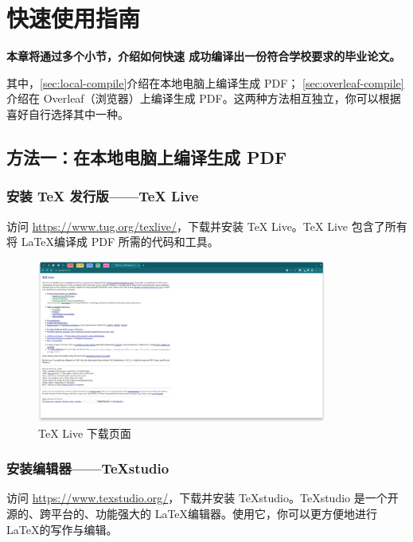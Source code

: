 \chapter{快速使用指南}
\label{ch:quick-start}

\textbf{本章将通过多个小节，介绍如何快速
成功编译出一份符合学校要求的毕业论文。}

其中，\autoref{sec:local-compile}介绍在本地电脑上编译生成 PDF；
\autoref{sec:overleaf-compile}介绍在 Overleaf（浏览器）上编译生成 PDF。这两种方法相互独立，你可以根据喜好自行选择其中一种。

\section{方法一：在本地电脑上编译生成 PDF}
\label{sec:local-compile}

\subsection{安装 TeX 发行版——TeX Live}

访问 \url{https://www.tug.org/texlive/}，下载并安装 TeX Live。TeX Live 包含了所有将 \LaTeX 编译成 PDF 所需的代码和工具。

\begin{figure}[H]
  \begin{center}
    \includegraphics[width=0.85\textwidth]{imgs/local-texlive-download.png}
  \end{center}
  \caption{TeX Live 下载页面}
  \label{fig:local-texlive-download}
\end{figure}

\subsection{安装编辑器——TeXstudio}

访问 \url{https://www.texstudio.org/}，下载并安装 TeXstudio。TeXstudio 是一个开源的、跨平台的、功能强大的 \LaTeX 编辑器。使用它，你可以更方便地进行 \LaTeX 的写作与编辑。

